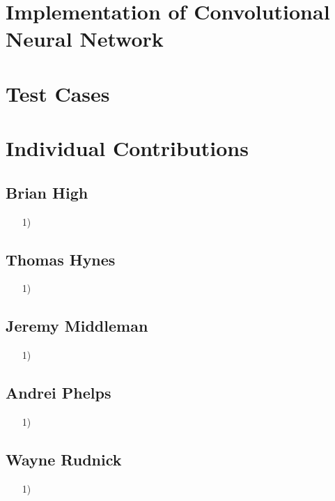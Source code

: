 \documentclass{article}
\begin{document}
\section{Implementation of Convolutional Neural Network}

\section{Test Cases}

\section{Individual Contributions}

\subsection{Brian High}
\begin{itemize}
    \item[1)] 
\end{itemize}

\subsection{Thomas Hynes}
\begin{itemize}
    \item[1)] 
\end{itemize}

\subsection{Jeremy Middleman}
\begin{itemize}
    \item[1)] 
\end{itemize}

\subsection{Andrei Phelps}
\begin{itemize}
    \item[1)] 
\end{itemize}

\subsection{Wayne Rudnick}
\begin{itemize}
    \item[1)] 
\end{itemize}
\end{document}
